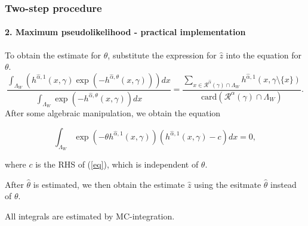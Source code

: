 \documentclass[c, 10pt]{beamer}
\begin{document}
\begin{frame}\frametitle{Two-step procedure}\framesubtitle{2. Maximum pseudolikelihood - practical implementation}
\begin{small}

To obtain the estimate for $\theta$, substitute the expression for $\hat z$ into the equation for $\theta$.
\begin{equation}\label{eq}
\frac{\int_{\Lambda_W } (h^{\hat\alpha,1}(x,\gamma)\exp{\left(-h^{\hat\alpha,\theta}(x,\gamma)\right)}) dx} {  \int_{\Lambda_W } \exp{\left( -h^{\hat\alpha,\theta}(x,\gamma)\right)} dx} 
= \frac {\sum_{x \in \mathcal R^{\hat\alpha}(\gamma)\cap \Lambda_W } h^{\hat\alpha,1}(x,\gamma\setminus\{x\})} { \mbox{card}(\mathcal R^\alpha(\gamma)\cap \Lambda_W ) }. 
\end{equation}
After some algebraic manipulation, we obtain the equation

$$\int_{\Lambda_W} \exp{\left(-\theta h^{\hat\alpha, 1}(x,\gamma)\right)} (h^{\hat\alpha, 1}(x,\gamma) - c) dx = 0 ,$$

where $c$ is the RHS of (\ref{eq}), which is independent of $\theta$. \newline

After $\hat\theta$ is estimated, we then obtain the estimate $\hat z$ using the esitmate $\hat\theta$ instead of $\theta$.

All integrals are estimated by MC-integration.
\end{small}
\end{frame}


\end{document}
